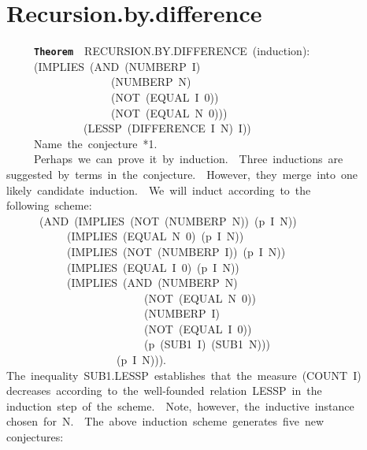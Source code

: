 \documentclass[11pt]{book}
\newenvironment{pubasis}{\begin{flushleft}\ttfamily\small}{\normalsize\rmfamily\end{flushleft}}
\newcommand{\axiomordefinition}[1]{\vspace{6pt}\texttt{\textbf{#1}}}
\newcommand{\pubdefaulttextsize}{\large}
\begin{document}
\section{Recursion.by.difference}
\pubdefaulttextsize
\begin{pubasis}
~~~~~\axiomordefinition{Theorem}~~RECURSION.BY.DIF\-FER\-ENCE~(induction):\\
~~~~~(IMPLIES~(AND~(NUMBERP~I)\\
~~~~~~~~~~~~~~~~~~~(NUMBERP~N)\\
~~~~~~~~~~~~~~~~~~~(NOT~(EQUAL~I~0))\\
~~~~~~~~~~~~~~~~~~~(NOT~(EQUAL~N~0)))\\
~~~~~~~~~~~~~~(LESSP~(DIFFERENCE~I~N)~I))\\

~~~~~Name~the~conjecture~*1.\\

~~~~~Perhaps~we~can~prove~it~by~induction.~~Three~inductions~are\\
suggested~by~terms~in~the~conjecture.~~However,~they~merge~into~one\\
likely~candidate~induction.~~We~will~induct~according~to~the\\
following~scheme:\\
~~~~~~(AND~(IMPLIES~(NOT~(NUMBERP~N))~(p~I~N))\\
~~~~~~~~~~~(IMPLIES~(EQUAL~N~0)~(p~I~N))\\
~~~~~~~~~~~(IMPLIES~(NOT~(NUMBERP~I))~(p~I~N))\\
~~~~~~~~~~~(IMPLIES~(EQUAL~I~0)~(p~I~N))\\
~~~~~~~~~~~(IMPLIES~(AND~(NUMBERP~N)\\
~~~~~~~~~~~~~~~~~~~~~~~~~(NOT~(EQUAL~N~0))\\
~~~~~~~~~~~~~~~~~~~~~~~~~(NUMBERP~I)\\
~~~~~~~~~~~~~~~~~~~~~~~~~(NOT~(EQUAL~I~0))\\
~~~~~~~~~~~~~~~~~~~~~~~~~(p~(SUB1~I)~(SUB1~N)))\\
~~~~~~~~~~~~~~~~~~~~(p~I~N))).\\
The~inequality~SUB1.LESSP~establishes~that~the~measure~(COUNT~I)\\
decreases~according~to~the~well-founded~relation~LESSP~in~the\\
induction~step~of~the~scheme.~~Note,~however,~the~inductive~instance\\
chosen~for~N.~~The~above~induction~scheme~generates~five~new\\
conjectures:\\


\end{pubasis}
\end{document}
